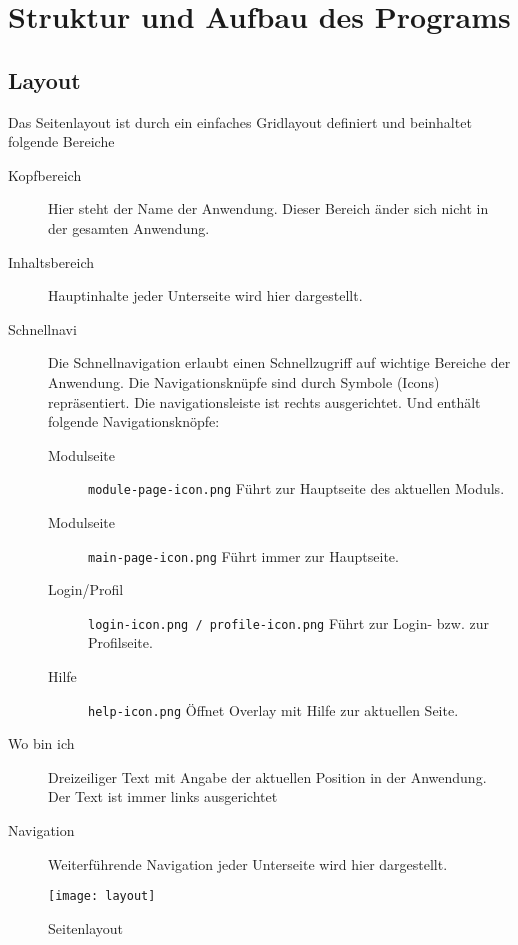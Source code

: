 \chapter{Struktur und Aufbau des Programs}

%
%
%
\section*{Layout}
\label{sec:layout}

Das Seitenlayout ist durch ein einfaches Gridlayout definiert und beinhaltet folgende Bereiche
\begin{description}
  \item[Kopfbereich] Hier steht der Name der Anwendung. Dieser Bereich änder sich nicht in der gesamten Anwendung.
  \item[Inhaltsbereich] Hauptinhalte jeder Unterseite wird hier dargestellt.
  \item[Schnellnavi] Die Schnellnavigation erlaubt einen Schnellzugriff auf wichtige Bereiche der Anwendung. Die Navigationsknüpfe sind durch Symbole (Icons) repräsentiert. Die navigationsleiste ist rechts ausgerichtet. Und enthält folgende Navigationsknöpfe:
  \begin{description}
    \item[Modulseite] \texttt{module-page-icon.png} Führt zur Hauptseite des aktuellen Moduls. 
    \item[Modulseite] \texttt{main-page-icon.png} Führt immer zur Hauptseite. 
    \item[Login/Profil] \texttt{login-icon.png / profile-icon.png} Führt zur Login- bzw. zur Profilseite. 
    \item[Hilfe] \texttt{help-icon.png} Öffnet Overlay mit Hilfe zur aktuellen Seite. 
  \end{description}
  
  \item[Wo bin ich] Dreizeiliger Text mit Angabe der aktuellen Position in der Anwendung. Der Text ist immer links ausgerichtet
  \item[Navigation] Weiterführende Navigation jeder Unterseite wird hier dargestellt.
\end{description}

\begin{figure}[!ht]
  \centering
  \texttt{[image: layout]}\\
  \caption{Seitenlayout}
  \label{fig:layout}
\end{figure}


